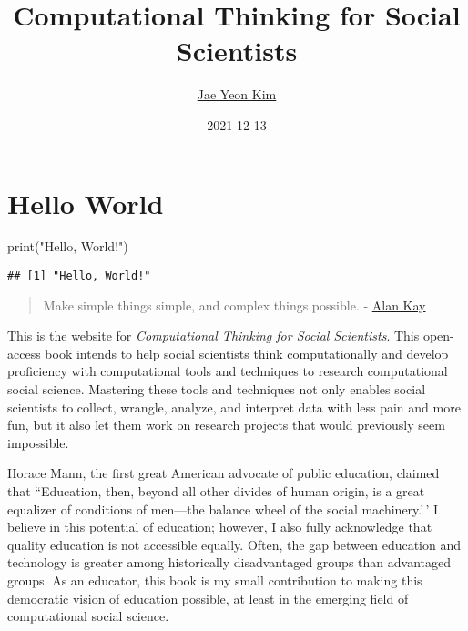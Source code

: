 \documentclass[
]{book}
\title{Computational Thinking for Social Scientists}
\author{\href{https://jaeyk.github.io/}{Jae Yeon Kim}}
\date{2021-12-13}
\newenvironment{Shaded}{\begin{snugshade}}{\end{snugshade}}
\newcommand{\FunctionTok}[1]{\textcolor[rgb]{0.00,0.00,0.00}{#1}}
\newcommand{\NormalTok}[1]{#1}
\newcommand{\StringTok}[1]{\textcolor[rgb]{0.31,0.60,0.02}{#1}}
\begin{document}
\maketitle

{
\hypersetup{linkcolor=}
\setcounter{tocdepth}{1}
\tableofcontents
}
\hypertarget{hello-world}{%
\chapter{Hello World}\label{hello-world}}

\begin{Shaded}
\begin{Highlighting}[]
\FunctionTok{print}\NormalTok{(}\StringTok{"Hello, World!"}\NormalTok{)}
\end{Highlighting}
\end{Shaded}

\begin{verbatim}
## [1] "Hello, World!"
\end{verbatim}

\begin{quote}
Make simple things simple, and complex things possible. - \href{https://www.quora.com/What-is-the-story-behind-Alan-Kay-s-adage-Simple-things-should-be-simple-complex-things-should-be-possible}{Alan Kay}
\end{quote}

This is the website for \emph{Computational Thinking for Social Scientists}. This open-access book intends to help social scientists think computationally and develop proficiency with computational tools and techniques to research computational social science. Mastering these tools and techniques not only enables social scientists to collect, wrangle, analyze, and interpret data with less pain and more fun, but it also let them work on research projects that would previously seem impossible.

Horace Mann, the first great American advocate of public education, claimed that ``Education, then, beyond all other divides of human origin, is a great equalizer of conditions of men---the balance wheel of the social machinery.'\,' I believe in this potential of education; however, I also fully acknowledge that quality education is not accessible equally. Often, the gap between education and technology is greater among historically disadvantaged groups than advantaged groups. As an educator, this book is my small contribution to making this democratic vision of education possible, at least in the emerging field of computational social science.
\end{document}
